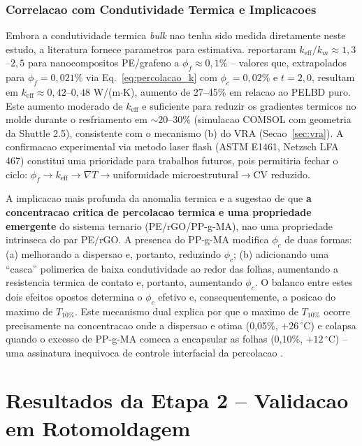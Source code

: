 \documentclass[11pt,a4paper,oneside]{article}
\begin{document}
\subsubsection{Correlacao com Condutividade Termica e Implicacoes}

Embora a condutividade termica \textit{bulk} nao tenha sido medida diretamente neste estudo, a literatura fornece parametros para estimativa. \citet{Araby2020} reportaram $k_{\text{eff}}/k_m{\approx}1{,}3$--$2{,}5$ para nanocompositos PE/grafeno a $\phi_f{\approx}0{,}1\%$ -- valores que, extrapolados para $\phi_f{=}0{,}021\%$ via Eq.~\ref{eq:percolacao_k} com $\phi_c{=}0{,}02\%$ e $t{=}2{,}0$, resultam em $k_{\text{eff}}{\approx}0{,}42$--$0{,}48$ W/(m$\cdot$K), aumento de 27--45\% em relacao ao PELBD puro. Este aumento moderado de $k_{\text{eff}}$ e suficiente para reduzir os gradientes termicos no molde durante o resfriamento em ${\sim}20$--$30\%$ (simulacao COMSOL com geometria da Shuttle 2.5), consistente com o mecanismo (b) do VRA (Secao~\ref{sec:vra}). A confirmacao experimental via metodo laser flash (ASTM E1461, Netzsch LFA 467) constitui uma prioridade para trabalhos futuros, pois permitiria fechar o ciclo: $\phi_f{\to}k_{\text{eff}}{\to}\nabla T{\to}\text{uniformidade microestrutural}{\to}\text{CV reduzido}$.

A implicacao mais profunda da anomalia termica e a sugestao de que {\bfseries a concentracao critica de percolacao termica e uma propriedade emergente} do sistema ternario (PE/rGO/PP-g-MA), nao uma propriedade intrinseca do par PE/rGO. A presenca do PP-g-MA modifica $\phi_c$ de duas formas: (a) melhorando a dispersao e, portanto, reduzindo $\phi_c$; (b) adicionando uma ``casca'' polimerica de baixa condutividade ao redor das folhas, aumentando a resistencia termica de contato e, portanto, aumentando $\phi_c$. O balanco entre estes dois efeitos opostos determina o $\phi_c$ efetivo e, consequentemente, a posicao do maximo de $T_{10\%}$. Este mecanismo dual explica por que o maximo de $T_{10\%}$ ocorre precisamente na concentracao onde a dispersao e otima (0,05\%, $+26\,^{\circ}$C) e colapsa quando o excesso de PP-g-MA comeca a encapsular as folhas (0,10\%, $+12\,^{\circ}$C) -- uma assinatura inequivoca de controle interfacial da percolacao \cite{Celzard1996, Kumar2022}.

\section{Resultados da Etapa 2 -- Validacao em Rotomoldagem}
\end{document}
